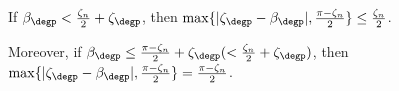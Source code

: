  

% 		




 \medskip\lemma
If $\beta_\degp < \tfrac{\zeta_n}{2}+\zeta_\degp$, then
$\max\{|\zeta_\degp  - \beta_\degp |, \tfrac{\pi - \zeta_n}{2}\} \leq \tfrac{\zeta_n}{2}$.

Moreover, if $\beta_\degp \leq \tfrac{\pi - \zeta_n}{2} + \zeta_\degp (< \tfrac{\zeta_n}{2}+\zeta_\degp)$, then $\max\{|\zeta_\degp  - \beta_\degp |, \tfrac{\pi - \zeta_n}{2}\} = \tfrac{\pi - \zeta_n}{2}$.

